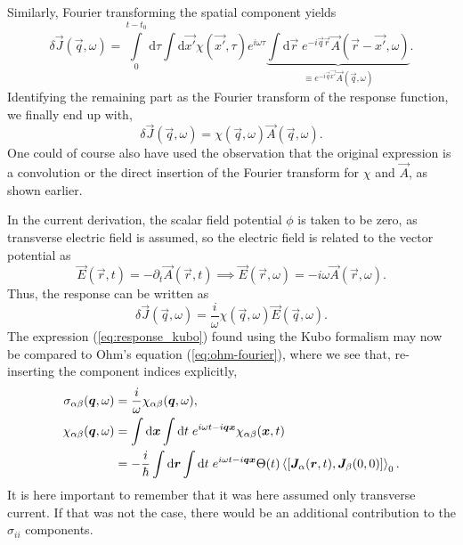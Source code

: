 Similarly, Fourier transforming the spatial component yields
\begin{equation}
  \label{eq:resonse_fourier}
  \delta \vec{J}(\vec{q}, \omega) =
  \int\limits_0^{t - t_0}\mathrm{d}\tau
  \int \mathrm{d} \vec{x'}
  \chi(\vec{x'}, \tau)
  e^{i \omega\tau}
  \underbrace{
    \int \mathrm{d}\vec{r} \;
    e^{-i \vec{q} \vec{r}}
  \vec{A}(\vec{r} - \vec{x'}, \omega)
  }_{\equiv e^{-i \vec{q} \vec{x'}} \vec{A}(\vec{q}, \omega)}.
\end{equation}
Identifying the remaining part as the Fourier transform of the response function, we finally end up with,
\begin{equation}
  \delta \vec{J}(\vec{q}, \omega) =
  \chi(\vec{q}, \omega)
  \vec{A}(\vec{q}, \omega).
\end{equation}
One could of course also have used the observation that the original expression is a convolution or the direct insertion of the Fourier transform for $\chi $ and $\vec{A}$, as shown earlier.

In the current derivation, the scalar field potential $\phi$ is taken to be zero, as transverse electric field is assumed, so the electric field is related to the vector potential as
\begin{equation}
  \label{eq:em_field_electric}
  \vec{E}(\vec{r}, t) = -\partial_t \vec{A}(\vec{r}, t) \implies \vec{E}(\vec{r}, \omega) = -i \omega \vec{A}(\vec{r}, \omega).
\end{equation}
Thus, the response can be written as
\begin{equation}
  \label{eq:response_kubo}
  \delta \vec{J}(\vec{q}, \omega) =
  \frac{i}{\omega}
  \chi(\vec{q}, \omega)
  \vec{E}(\vec{q}, \omega).
\end{equation}
The expression (\ref{eq:response_kubo}) found using the Kubo formalism may now be compared to Ohm's equation (\ref{eq:ohm-fourier}), where we see that, re-inserting the component indices explicitly,
\begin{align}
    \sigma_{\alpha\beta}(\vec{q}, \omega) &= \frac{i}{\omega} \chi_{\alpha\beta}(\vec{q}, \omega), \\
  \chi_{\alpha\beta}(\vec{q}, \omega) &= \int \mathrm{d}\vec{x} \int \mathrm{d} t \; e^{i\omega t -i \vec{q} \vec{x}}\chi_{\alpha\beta}(\vec{x}, t)\\
  &=
    -\frac{i}{\hbar}\int \mathrm{d} \vec{r} \int \mathrm{d} t \; e^{i \omega t - i \vec{q} \vec{x}}
    \Theta (t)
    \Braket{\left[
       \vec{J}_{\alpha}(\vec{r}, t), \vec{J}_{\beta}(0, 0)
      \right]}_0. \nonumber
\end{align}
It is here important to remember that it was here assumed only transverse current.
If that was not the case, there would be an additional contribution to the $\sigma_{ii}$ components.


